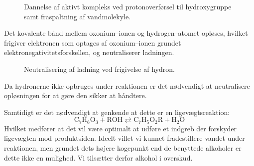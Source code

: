     \begin{figure}[H]
        \caption{Dannelse af aktivt kompleks ved protonoverførsel til hydroxygruppe samt fraspaltning af vandmolekyle.}
    \end{figure}
    Det kovalente bånd mellem oxonium--ionen og hydrogen--atomet opløses, hvilket frigiver elektronen som optages af oxonium--ionen grundet elektronegativitetsforskellen, og neutraliserer ladningen.
    \begin{figure}[H]
        \caption{Neutralisering af ladning ved frigivelse af hydron.}
    \end{figure}
    Da hydronerne ikke opbruges under reaktionen er det nødvendigt at neutralisere opløsningen for at gøre den sikker at håndtere.

    Samtidigt er det nødvendigt at genkende at dette er en ligevægtsreaktion: 
    \[
    \mathrm{C_7H_6O_3+ROH} \rightleftarrows \mathrm{C_7H_5O_2R+H_2O}
    \] 
    Hvilket medfører at det vil være optimalt at udføre et indgreb der forskyder ligevægten mod produktsiden. Ideelt villet vi kunnet fradestillere vandet under reaktionen, men grundet dets højere kogepunkt end de benyttede alkoholer er dette ikke en mulighed. Vi tilsætter derfor alkohol i overskud.
    
